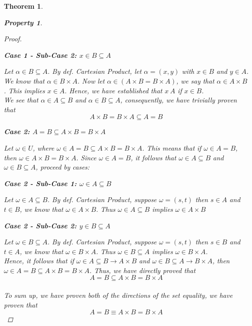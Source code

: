 \documentclass{book}
\newtheorem{theorem}{Theorem}[section]
\newtheorem{property}{Property}[theorem]
\theoremstyle{definition}
\theoremstyle{remark}
\begin{document}
\begin{theorem}
\begin{property}
\begin{proof}
                    \begin{flushleft} \textbf{Case 1 - Sub-Case 2: $x \in B \subseteq A$} \end{flushleft}  
                        Let $\alpha \in B \subseteq A$. By def. Cartesian Product, let $\alpha = (x,y)$ with $x \in B$ and $y \in A$. We know that $\alpha \in B \times A$. Now let $\alpha \in (A \times B = B \times A)$, we say that $\alpha \in A \times B$. This implies $x \in A$. Hence, we have established that $x \ A$ if $x \in B$. \\
                We see that $\alpha \in A \subseteq B$ and $\alpha \in B \subseteq A$, consequently, we have trivially proven that $$ A \times B = B \times A \subseteq A = B$$
                
            \begin{flushleft} \textbf{Case 2: $A=B \subseteq A \times B = B \times A$} \end{flushleft} 
                Let $\omega \in U$, where $\omega \in A = B \subseteq A \times B = B \times A$. This means that if $\omega \in A=B$, then $\omega \in A \times B = B \times A$. Since $\omega \in A = B$, it follows that $\omega \in A \subseteq B$ and $\omega \in B \subseteq A$, proceed by cases:
                
                    \begin{flushleft} \textbf{Case 2 - Sub-Case 1: $\omega \in A \subseteq B$} \end{flushleft}
                        Let $\omega \in A \subseteq B$. By def. Cartesian Product, suppose $\omega = (s,t)$ then $s \in A$ and $t \in B$, we know that $\omega \in A \times B$. Thus $\omega \in A \subseteq B$ implies $\omega \in A \times B$
                    
                    \begin{flushleft} \textbf{Case 2 - Sub-Case 2: $y \in B \subseteq A$} \end{flushleft}  
                        Let $\omega \in B \subseteq A$. By def. Cartesian Product, suppose $\omega = (s,t)$ then $s \in B$ and $t \in A$, we know that $\omega \in B \times A$. Thus $\omega \in B \subseteq A$ implies $\omega \in B \times A$. \\
                
                Hence, it follows that if $\omega \in A \subseteq B \to A \times B$ and $\omega \in B \subseteq A \to B \times A$, then $\omega \in A=B \subseteq A \times B = B \times A$. Thus, we have directly proved that $$ A=B \subseteq A \times B = B \times A $$\\  
            To sum up, we have proven both of the directions of the set equality, we have proven that $$ A = B \equiv A \times B = B \times A $$
        \end{proof}
    \end{property}
\end{theorem}
\end{document}
